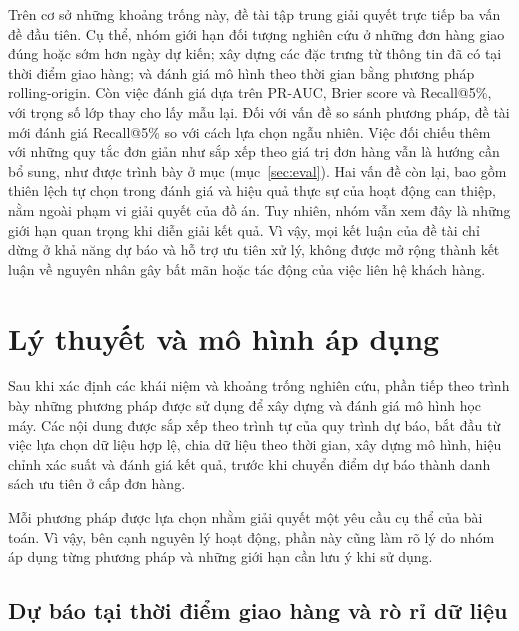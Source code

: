 \documentclass[12pt,a4paper]{report}
\begin{document}
Trên cơ sở những khoảng trống này, đề tài tập trung giải quyết trực tiếp ba vấn đề đầu tiên. Cụ thể, nhóm giới hạn đối tượng nghiên cứu ở những đơn hàng giao đúng hoặc sớm hơn ngày dự kiến; xây dựng các đặc trưng từ thông tin đã có tại thời điểm giao hàng; và đánh giá mô hình theo thời gian bằng phương pháp rolling-origin. Còn việc đánh giá dựa trên PR-AUC, Brier score và Recall@5\%, với trọng số lớp thay cho lấy mẫu lại. Đối với vấn đề so sánh phương pháp, đề tài mới đánh giá Recall@5\% so với cách lựa chọn ngẫu nhiên. Việc đối chiếu thêm với những quy tắc đơn giản như sắp xếp theo giá trị đơn hàng vẫn là hướng cần bổ sung, như được trình bày ở mục (mục~\ref{sec:eval}). Hai vấn đề còn lại, bao gồm thiên lệch tự chọn trong đánh giá và hiệu quả thực sự của hoạt động can thiệp, nằm ngoài phạm vi giải quyết của đồ án. Tuy nhiên, nhóm vẫn xem đây là những giới hạn quan trọng khi diễn giải kết quả. Vì vậy, mọi kết luận của đề tài chỉ dừng ở khả năng dự báo và hỗ trợ ưu tiên xử lý, không được mở rộng thành kết luận về nguyên nhân gây bất mãn hoặc tác động của việc liên hệ khách hàng.

\section{Lý thuyết và mô hình áp dụng}\label{sec:theory-models}

Sau khi xác định các khái niệm và khoảng trống nghiên cứu, phần tiếp theo trình bày những phương pháp được sử dụng để xây dựng và đánh giá mô hình học máy. Các nội dung được sắp xếp theo trình tự của quy trình dự báo, bắt đầu từ việc lựa chọn dữ liệu hợp lệ, chia dữ liệu theo thời gian, xây dựng mô hình, hiệu chỉnh xác suất và đánh giá kết quả, trước khi chuyển điểm dự báo thành danh sách ưu tiên ở cấp đơn hàng.

Mỗi phương pháp được lựa chọn nhằm giải quyết một yêu cầu cụ thể của bài toán. Vì vậy, bên cạnh nguyên lý hoạt động, phần này cũng làm rõ lý do nhóm áp dụng từng phương pháp và những giới hạn cần lưu ý khi sử dụng.

\subsection{Dự báo tại thời điểm giao hàng và rò rỉ dữ liệu}\label{sec:th-pit}
\end{document}
